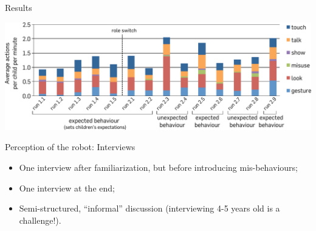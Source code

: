 \documentclass[compress]{beamer}
\begin{document}
\begin{frame}{Results}
    \begin{center}
    \includegraphics[width=\textwidth]{domino-time-active}
    \end{center}



\end{frame}

\begin{frame}{Perception of the robot: Interviews}

    \begin{itemize}
        \item<1-> One interview after familiarization, but before introducing
            mis-behaviours;
        \item<2-> One interview at the end;
        \item<3-> Semi-structured, ``informal'' discussion (interviewing 4-5 years
            old is a challenge!).
    \end{itemize}

\end{frame}
\end{document}
